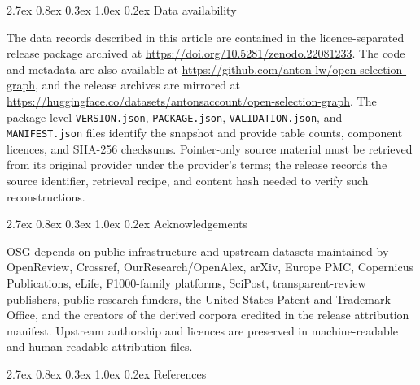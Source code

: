 \documentclass[
  10pt,
]{article}
\makeatletter
\renewcommand\section{\@startsection{section}{1}{\z@}%
  {2.7ex \@plus 0.8ex \@minus 0.3ex}%
  {1.0ex \@plus 0.2ex}%
  {\normalfont\Large\sffamily\bfseries\color{OSGInk}}}
\makeatother
\begin{document}
\section{Data availability}\label{data-availability}

The data records described in this article are contained in the
licence-separated release package archived at
\url{https://doi.org/10.5281/zenodo.22081233}. The code and metadata are
also available at
\url{https://github.com/anton-lw/open-selection-graph}, and the release
archives are mirrored at
\url{https://huggingface.co/datasets/antonsaccount/open-selection-graph}.
The
package-level \texttt{VERSION.json}, \texttt{PACKAGE.json},
\texttt{VALIDATION.json}, and \texttt{MANIFEST.json} files identify the
snapshot and provide table counts, component licences, and SHA-256
checksums. Pointer-only source material must be retrieved from its
original provider under the provider's terms; the release records the
source identifier, retrieval recipe, and content hash needed to verify
such reconstructions.

\section{Acknowledgements}\label{acknowledgements}

OSG depends on public infrastructure and upstream datasets
maintained by OpenReview, Crossref, OurResearch/OpenAlex, arXiv, Europe
PMC, Copernicus Publications, eLife, F1000-family platforms, SciPost,
transparent-review publishers, public research funders, the United
States Patent and Trademark Office, and the creators of the derived
corpora credited in the release attribution manifest. Upstream
authorship and licences are preserved in machine-readable and
human-readable attribution files.

\section{References}\label{references}
\end{document}
